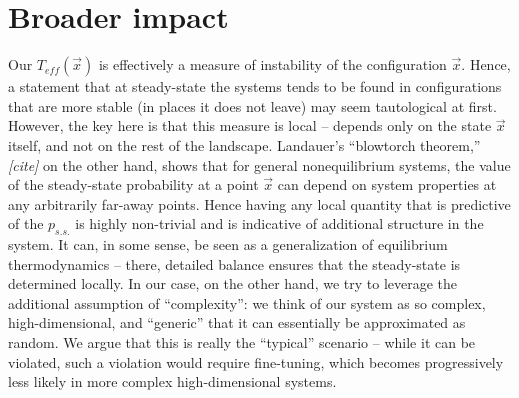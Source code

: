 \documentclass[reprint,prx]{revtex4-1}
\renewcommand{\v}[1]{\ensuremath{\vec{#1}}} %
\renewcommand{\=}[1]{\stackrel{#1}{=}} %
\renewcommand{\(}{\left (}
\renewcommand{\)}{\right  )}
\renewcommand{\[}{\left [}
\renewcommand{\]}{\right ]}
\newcommand{\<}{\left <}
\renewcommand{\>}{\right >}
\theoremstyle{definition}
\theoremstyle{remark}
\renewcommand{\todo}[1]{\textit{\color{red}[#1]}}
\begin{document}
\section{Broader impact}
Our $ T_{eff}(\v{x}) $ is effectively a measure of instability of the configuration $ \v{x} $. Hence, a statement that at steady-state the systems tends to be found in configurations that are more stable (in places it does not leave) may seem tautological at first. However, the key here is that this measure is local -- depends only on the state $ \v{x} $ itself, and not on the rest of the landscape. Landauer's ``blowtorch theorem,'' \todo{cite} on the other hand, shows that for general nonequilibrium systems, the value of the steady-state probability at a point $ \v{x} $ can depend on system properties at any arbitrarily far-away points. Hence having any local quantity that is predictive of the $ p_{s.s.} $ is highly non-trivial and is indicative of additional structure in the system. It can, in some sense, be seen as a generalization of equilibrium thermodynamics -- there, detailed balance ensures that the steady-state is determined locally. In our case, on the other hand, we try to leverage the additional assumption of ``complexity'': we think of our system as so complex, high-dimensional, and ``generic'' that it can essentially be approximated as random. We argue that this is really the ``typical'' scenario -- while it can be violated, such a violation would require fine-tuning, which becomes progressively less likely in more complex high-dimensional systems.
\end{document}
